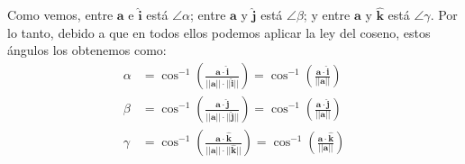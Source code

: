 \documentclass[12pt]{article}
\begin{document}
Como vemos, entre $\mathbf{a}$ e $\hat{\mathbf{i}}$ está $\angle \alpha$; entre $\mathbf{a}$ y $\hat{\mathbf{j}}$ está $\angle \beta$; y entre $\mathbf{a}$ y $\hat{\mathbf{k}}$ está $\angle \gamma$. Por lo tanto, debido a que en todos ellos podemos aplicar la ley del coseno, estos ángulos los obtenemos como:
\begin{align*}
  \alpha &= \cos^{-1}\left(\frac{\mathbf{a} \cdot \hat{\mathbf{i}}}{||\mathbf{a}|| \cdot ||\hat{\mathbf{i}}||}\right)
          = \cos^{-1}\left(\frac{\mathbf{a} \cdot \hat{\mathbf{i}}}{||\mathbf{a}||}\right) \\
  \beta &= \cos^{-1}\left(\frac{\mathbf{a} \cdot \hat{\mathbf{j}}}{||\mathbf{a}|| \cdot ||\hat{\mathbf{j}}||}\right)
          = \cos^{-1}\left(\frac{\mathbf{a} \cdot \hat{\mathbf{j}}}{||\mathbf{a}||}\right) \\
  \gamma &= \cos^{-1}\left(\frac{\mathbf{a} \cdot \hat{\mathbf{k}}}{||\mathbf{a}|| \cdot ||\hat{\mathbf{k}}||}\right)
          = \cos^{-1}\left(\frac{\mathbf{a} \cdot \hat{\mathbf{k}}}{||\mathbf{a}||}\right)
\end{align*}
\end{document}
